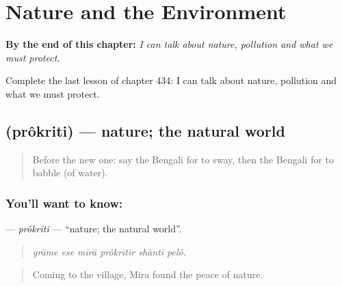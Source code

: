 
\chapter{Nature and the Environment}
\label{ch:bn-nature-and-the-environment}

\begin{chapteropening}
\textbf{By the end of this chapter:} \emph{I can talk about nature, pollution and what we must protect.}

Complete the last lesson of chapter 434: I can talk about nature, pollution and what we must protect.
\end{chapteropening}

\section[\texorpdfstring{\bn{প্রকৃতি} (prôkriti)}{প্রকৃতি (prôkriti)}]{ (prôkriti) — nature; the natural world}

\label{lesson:BN-C434-prokriti}



\begin{quote}
Before the new one: say the Bengali for to sway, then the Bengali for to babble (of water).
\end{quote}

\subsection*{You'll want to know: }
\textbf{} — \emph{prôkriti} — \textquotedblleft{}nature; the natural world\textquotedblright{}.

\begin{quote}
     
\end{quote}

\begin{quote}
\emph{grāme ese mīrā prôkritir shānti pelô.}
\end{quote}

\begin{quote}
Coming to the village, Mira found the peace of nature.
\end{quote}

